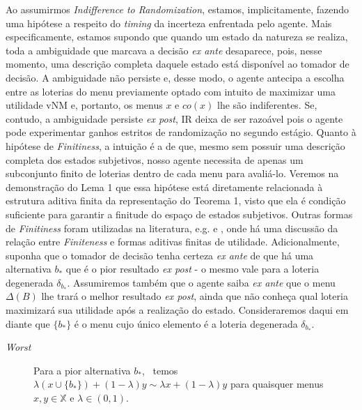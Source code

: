 \documentclass[11pt, a4paper]{article}
\theoremstyle{nonumberplain}
\theoremstyle{plain}
\theoremstyle{plain}
\theoremstyle{plain}
\theoremstyle{nonumberplain}
\begin{document}
Ao assumirmos \emph{Indifference to Randomization}, estamos, implicitamente, fazendo uma hipótese a respeito do \emph{timing} da incerteza enfrentada pelo agente. Mais especificamente, estamos supondo que quando um estado da natureza se realiza, toda a ambiguidade que marcava a decisão \emph{ex ante} desaparece, pois, nesse momento, uma descrição completa daquele estado está disponível ao tomador de decisão. A ambiguidade não persiste e, desse modo, o agente antecipa a escolha entre as loterias do menu previamente optado com intuito de maximizar uma utilidade vNM e, portanto, os menus $x$ e $co(x)$ lhe são indiferentes. Se, contudo, a ambiguidade persiste \emph{ex post}, IR deixa de ser razoável pois o agente pode experimentar ganhos estritos de randomização no segundo estágio.
Quanto à hipótese de \emph{Finitiness}, a intuição é a de que, mesmo sem possuir uma descrição completa dos estados subjetivos, nosso agente necessita de apenas um subconjunto finito de loterias dentro de cada menu para avaliá-lo. Veremos na demonstração do Lema 1 que essa hipótese está diretamente relacionada à estrutura aditiva finita da representação do Teorema 1, visto que ela é condição suficiente para garantir a finitude do espaço de estados subjetivos. Outras formas de \emph{Finitiness} foram utilizadas na literatura, e.g. \cite{Dekel2009} e \cite{Kopylov2009}, onde há uma discussão da relação entre \emph{Finiteness} e formas aditivas finitas de utilidade.
Adicionalmente, suponha que o tomador de decisão tenha certeza \textit{ex ante} de que há uma alternativa $b_*$ que é o pior resultado \textit{ex post} - o mesmo vale para a loteria degenerada $\delta_{b_*}$. Assumiremos também que o agente saiba \textit{ex ante} que o menu $\Delta(B)$ lhe trará o melhor resultado \textit{ex post}, ainda que não conheça qual loteria maximizará sua utilidade após a realização do estado. Consideraremos daqui em diante que $\{b_*\}$ é o menu cujo único elemento é a loteria degenerada $\delta_{b_*}$.
\begin{description}
\item[\textit{Worst}] Para a pior alternativa $b_*$, ~temos $\lambda\left(x\cup \{b_*\}\right)+(1-\lambda)y\sim \lambda x + (1-\lambda)y$ para quaisquer menus $x,y\in \mathbb{X}$ e $\lambda\in (0,1)$.
\end{description}
\end{document}

